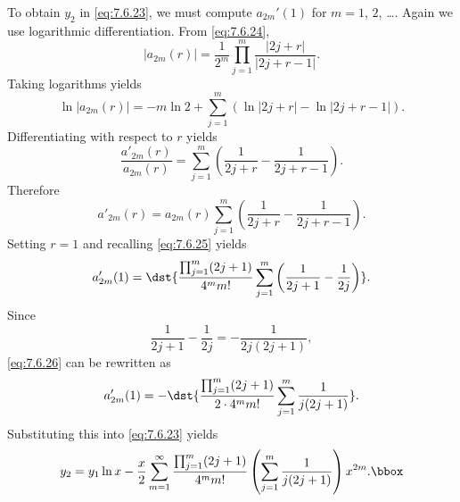 \begin{examplesolution}
To obtain $y_{2}$ in \eqref{eq:7.6.23}, we must compute $a_{2m}'(1)$ for $m=1$, $2$, \dots. Again we
use logarithmic differentiation. From \eqref{eq:7.6.24},
\[
  |a_{2m}(r)|=\frac{1}{2^{m}}\prod_{j=1}^{m}\frac{|2j+r|}{|2j+r-1|}.
\]
Taking logarithms yields
\[
  \ln|a_{2m}(r)|=-m\ln2+\sum^{m}_{j=1}\left(\ln |2j+r|-\ln|2j+r-1|\right).
\]
Differentiating with respect to $r$ yields
\[
  \frac{a'_{2m}(r)}{a_{2m}(r)}=\sum^{m}_{j=1}\left(\frac{1}{2j+r}-\frac{1}{2j+r-1}\right).
\]
Therefore
\[
  a'_{2m}(r)=a_{2m}(r)\sum^{m}_{j=1}\left(\frac{1}{2j+r}-\frac{1}{2j+r-1}\right).
\]
Setting $r=1$ and recalling \eqref{eq:7.6.25} yields
\begin{equation}
  \label{eq:7.6.26}a'_{2m}(1)=\dst{\frac{\prod_{j=1}^{m}(2j+1)}{4^{m}m!} \sum_{j=1}^{m}\left(\frac{1}{2j+1}-\frac{1}{2j}\right)}.
\end{equation}
Since
\[
  \frac{1}{2j+1}-\frac{1}{2j}=-\frac{1}{2j(2j+1)},
\]
\eqref{eq:7.6.26} can be rewritten as
\[
  a_{2m}'(1)=-\dst{\frac{\prod_{j=1}^{m}(2j+1)}{2\cdot4^{m}m!} \sum_{j=1}^{m}\frac{1}{j(2j+1)}}.
\]
Substituting this into \eqref{eq:7.6.23} yields
\[
  y_{2}=y_{1}\ln x-\frac{x}{2}\sum_{m=1}^{\infty}\frac{\prod_{j=1}^{m}(2j+1)}{4^{m}m!}\left(\sum_{j=1}^{m}\frac{1}{j(2j+1)}\right)x^{2m}.\bbox
\]
\end{examplesolution}

